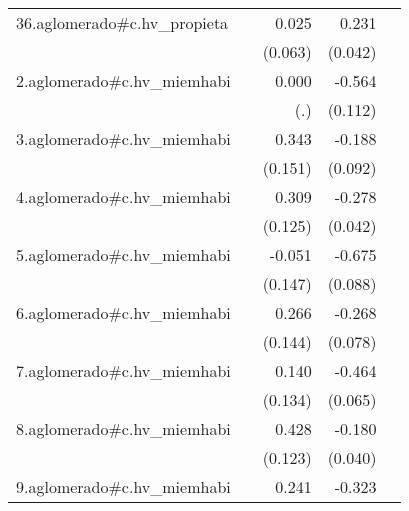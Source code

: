{\begin{longtable}{l*{4}{D{.}{.}{-1}}}
\addlinespace
36.aglomerado#c.hv\_propieta&                     &       0.025         &       0.231\sym{***}&                     \\
            &                     &     (0.063)         &     (0.042)         &                     \\
\addlinespace
2.aglomerado#c.hv\_miemhabi&                     &       0.000         &      -0.564\sym{***}&                     \\
            &                     &         (.)         &     (0.112)         &                     \\
\addlinespace
3.aglomerado#c.hv\_miemhabi&                     &       0.343\sym{*}  &      -0.188\sym{*}  &                     \\
            &                     &     (0.151)         &     (0.092)         &                     \\
\addlinespace
4.aglomerado#c.hv\_miemhabi&                     &       0.309\sym{*}  &      -0.278\sym{***}&                     \\
            &                     &     (0.125)         &     (0.042)         &                     \\
\addlinespace
5.aglomerado#c.hv\_miemhabi&                     &      -0.051         &      -0.675\sym{***}&                     \\
            &                     &     (0.147)         &     (0.088)         &                     \\
\addlinespace
6.aglomerado#c.hv\_miemhabi&                     &       0.266         &      -0.268\sym{***}&                     \\
            &                     &     (0.144)         &     (0.078)         &                     \\
\addlinespace
7.aglomerado#c.hv\_miemhabi&                     &       0.140         &      -0.464\sym{***}&                     \\
            &                     &     (0.134)         &     (0.065)         &                     \\
\addlinespace
8.aglomerado#c.hv\_miemhabi&                     &       0.428\sym{***}&      -0.180\sym{***}&                     \\
            &                     &     (0.123)         &     (0.040)         &                     \\
\addlinespace
9.aglomerado#c.hv\_miemhabi&                     &       0.241         &      -0.323\sym{***}&                     \\

\end{longtable}}
